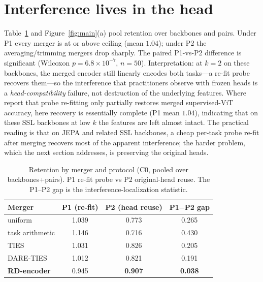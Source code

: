 \documentclass{article}
\begin{document}
\section{Interference lives in the head}
Table~\ref{tab:t1} and Figure~\ref{fig:main}(a) pool retention over backbones
and pairs. Under P1 every merger is at or above ceiling (mean $1.04$); under
P2 the averaging/trimming mergers drop sharply. The paired P1-vs-P2 difference
is significant (Wilcoxon $p=6.8\times10^{-7}$, $n{=}50$). Interpretation: at
$k{=}2$ on these backbones, the merged encoder still linearly encodes both
tasks---a re-fit probe recovers them---so the interference that practitioners
observe with frozen heads is a \emph{head-compatibility} failure, not
destruction of the underlying features. Where \citet{sharma2024nonlocal}
report that probe re-fitting only partially restores merged supervised-ViT
accuracy, here recovery is essentially complete (P1 mean $1.04$), indicating
that on these SSL backbones at low $k$ the features are left almost intact.
The practical reading is that on JEPA
and related SSL backbones, a cheap per-task probe re-fit after merging
recovers most of the apparent interference; the harder problem, which the
next section addresses, is preserving the original heads.

\begin{table}[t]\centering
\caption{Retention by merger and protocol (C0, pooled over backbones+pairs).
P1 re-fit probe vs P2 original-head reuse. The P1--P2 gap is the
interference-localization statistic.}\label{tab:t1}
\begin{tabular}{lccc}\toprule
Merger & P1 (re-fit) & P2 (head reuse) & P1$-$P2 gap \\\midrule
uniform          & 1.039 & 0.773 & 0.265 \\
task arithmetic  & 1.146 & 0.716 & 0.430 \\
TIES             & 1.031 & 0.826 & 0.205 \\
DARE-TIES        & 1.012 & 0.821 & 0.191 \\
\textbf{RD-encoder} & 0.945 & \textbf{0.907} & \textbf{0.038} \\\bottomrule
\end{tabular}
\end{table}
\end{document}
